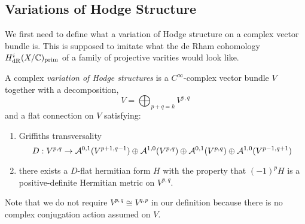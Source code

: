 \documentclass[12pt]{article}
\begin{document}
\subsection{Variations of Hodge Structure}

We first need to define what a variation of Hodge structure on a complex vector bundle is. This is supposed to imitate what the de Rham cohomology $H^i_{\mathrm{dR}}(X/\mathbb{C})_{\mathrm{prim}}$ of a family of projective varities would look like.

\begin{defn}
A complex \textit{variation of Hodge structures} is a $C^{\infty}$-complex vector bundle $V$ together with a decomposition,
\[ V = \bigoplus_{p + q = k} V^{p,q} \]
and a flat connection on $V$ satisfying:
\begin{enumerate}
\item Griffiths transversality
\[ D : V^{p,q} \to \mathcal{A}^{0,1}(V^{p+1,q-1}) \oplus \mathcal{A}^{1,0}(V^{p,q}) \oplus \mathcal{A}^{0,1}(V^{p,q}) \oplus \mathcal{A}^{1,0}(V^{p-1, q+1}) \]
\item there exists a $D$-flat hermitian form $H$ with the property that $(-1)^p H$ is a positive-definite Hermitian metric on $V^{p,q}$.
\end{enumerate}
\end{defn}

\begin{rmk}
Note that we do not require $V^{p,q} \cong V^{q,p}$ in our definition because there is no complex conjugation action assumed on $V$.
\end{rmk}
\end{document}
